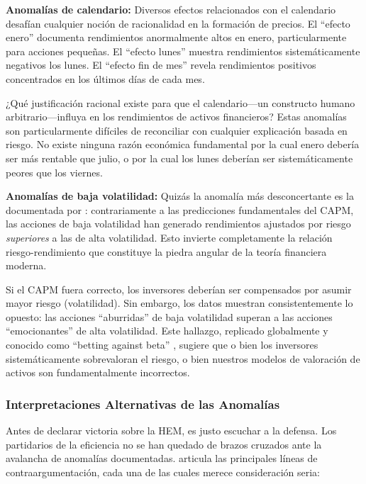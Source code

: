\documentclass[11pt,a4paper]{article}
\begin{document}
\textbf{Anomalías de calendario:} Diversos efectos relacionados con el calendario desafían cualquier noción de racionalidad en la formación de precios. El ``efecto enero'' \citep{rozeff1976} documenta rendimientos anormalmente altos en enero, particularmente para acciones pequeñas. El ``efecto lunes'' \citep{french1980} muestra rendimientos sistemáticamente negativos los lunes. El ``efecto fin de mes'' revela rendimientos positivos concentrados en los últimos días de cada mes.

¿Qué justificación racional existe para que el calendario---un constructo humano arbitrario---influya en los rendimientos de activos financieros? Estas anomalías son particularmente difíciles de reconciliar con cualquier explicación basada en riesgo. No existe ninguna razón económica fundamental por la cual enero debería ser más rentable que julio, o por la cual los lunes deberían ser sistemáticamente peores que los viernes.

\textbf{Anomalías de baja volatilidad:} Quizás la anomalía más desconcertante es la documentada por \citet{ang2006}: contrariamente a las predicciones fundamentales del CAPM, las acciones de baja volatilidad han generado rendimientos ajustados por riesgo \textit{superiores} a las de alta volatilidad. Esto invierte completamente la relación riesgo-rendimiento que constituye la piedra angular de la teoría financiera moderna.

Si el CAPM fuera correcto, los inversores deberían ser compensados por asumir mayor riesgo (volatilidad). Sin embargo, los datos muestran consistentemente lo opuesto: las acciones ``aburridas'' de baja volatilidad superan a las acciones ``emocionantes'' de alta volatilidad. Este hallazgo, replicado globalmente y conocido como ``betting against beta'' \citep{frazzini2012}, sugiere que o bien los inversores sistemáticamente sobrevaloran el riesgo, o bien nuestros modelos de valoración de activos son fundamentalmente incorrectos.

\subsubsection{Interpretaciones Alternativas de las Anomalías}

Antes de declarar victoria sobre la HEM, es justo escuchar a la defensa. Los partidarios de la eficiencia no se han quedado de brazos cruzados ante la avalancha de anomalías documentadas. \citet{malkiel2003} articula las principales líneas de contraargumentación, cada una de las cuales merece consideración seria:
\end{document}
